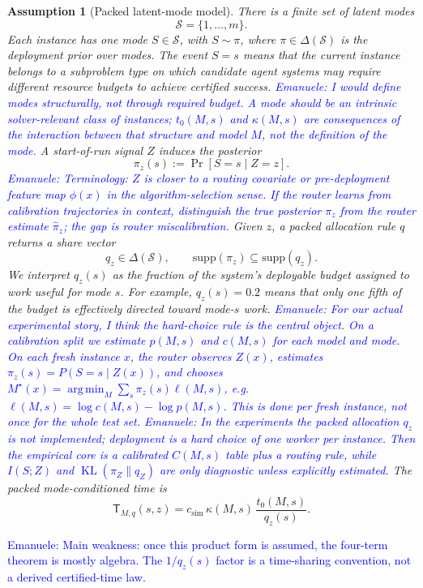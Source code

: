 \documentclass{article}
\newtheorem{assumption}{Assumption}
\newcounter{algorithm}
\DeclareMathOperator*{\argmin}{arg\,min}
\DeclareMathOperator{\KL}{KL}
\newcommand{\cS}{\mathcal{S}}
\begin{document}
\begin{assumption}[Packed latent-mode model]
\label{ass:packed}
There is a finite set of latent modes
\[
    \cS=\{1,\ldots,m\}.
\]
Each instance has one mode \(S\in\cS\), with \(S\sim\pi\), where \(\pi\in\Delta(\cS)\) is the deployment prior over modes.
The event \(S=s\) means that the current instance belongs to a subproblem type on which candidate agent systems may require different resource budgets to achieve certified success.
\textcolor{blue}{Emanuele: I would define modes structurally, not through required budget. A mode should be an intrinsic solver-relevant class of instances; \(t_0(M,s)\) and \(\kappa(M,s)\) are consequences of the interaction between that structure and model \(M\), not the definition of the mode.}
A start-of-run signal \(Z\) induces the posterior
\[
    \pi_z(s):=\Pr[S=s\mid Z=z].
\]
\textcolor{blue}{Emanuele: Terminology: \(Z\) is closer to a routing covariate or pre-deployment feature map \(\phi(x)\) in the algorithm-selection sense. If the router learns from calibration trajectories in context, distinguish the true posterior \(\pi_z\) from the router estimate \(\hat\pi_z\); the gap is router miscalibration.}
Given \(z\), a packed allocation rule \(q\) returns a share vector
\[
    q_z\in\Delta(\cS),
    \qquad
    \mathrm{supp}(\pi_z)\subseteq \mathrm{supp}(q_z).
\]
We interpret \(q_z(s)\) as the fraction of the system's deployable budget assigned to work useful for mode \(s\).
For example, \(q_z(s)=0.2\) means that only one fifth of the budget is effectively directed toward mode-\(s\) work.
\textcolor{blue}{Emanuele: For our actual experimental story, I think the hard-choice rule is the central object. On a calibration split we estimate \(p(M,s)\) and \(c(M,s)\) for each model and mode. On each fresh instance \(x\), the router observes \(Z(x)\), estimates \(\pi_z(s)=P(S=s\mid Z(x))\), and chooses \(M^\star(x)=\argmin_M\sum_s\pi_z(s)\ell(M,s)\), e.g. \(\ell(M,s)=\log c(M,s)-\log p(M,s)\). This is done per fresh instance, not once for the whole test set.}
\textcolor{blue}{Emanuele: In the experiments the packed allocation \(q_z\) is not implemented; deployment is a hard choice of one worker per instance. Then the empirical core is a calibrated \(C(M,s)\) table plus a routing rule, while \(I(S;Z)\) and \(\KL(\pi_Z\|q_Z)\) are only diagnostic unless explicitly estimated.}
The packed mode-conditioned time is
\[
    \mathsf T_{M,q}(s,z)
    =
    c_{\mathrm{sim}}\,
    \kappa(M,s)\,
    \frac{t_0(M,s)}{q_z(s)} .
\]
\end{assumption}
\textcolor{blue}{Emanuele: Main weakness: once this product form is assumed, the four-term theorem is mostly algebra. The \(1/q_z(s)\) factor is a time-sharing convention, not a derived certified-time law.}
\end{document}
